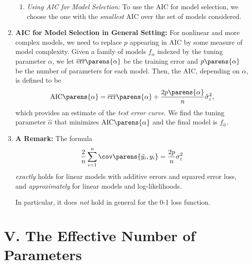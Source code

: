 \documentclass[12pt]{article}
\begin{document}
\begin{enumerate}[label=\textbf{\arabic*.}]
\begin{enumerate}
		\item \textit{Using AIC for Model Selection:} To use the AIC for model selection, we choose the one with the \emph{smallest} AIC over the set of models considered. 
		
	\end{enumerate}
	
	\item \textbf{AIC for Model Selection in General Setting:} For nonlinear and more complex models, we need to replace $p$ appearing in AIC by some measure of model complexity. \newline Given a family of models ${f}_{\alpha}$ indexed by the tuning parameter $\alpha$, we let $\overline{\mathrm{err}} \parens{\alpha}$ be the training error and $p \parens{\alpha}$ be the number of parameters for each model. Then, the AIC, depending on $\alpha$, is defined to be 
	\begin{align}
		\mathrm{AIC} \parens{\alpha} = \overline{\mathrm{err}} \parens{\alpha} + \frac{2 p \parens{\alpha}}{n} \hat{\sigma}_{\varepsilon}^2, 
	\end{align}
	which provides an estimate of the \textit{test error curve}. We find the tuning parameter $\hat{\alpha}$ that minimizes $\mathrm{AIC} \parens{\alpha}$ and the final model is $f_{\hat{\alpha}}$. 
	
	
	\item \textbf{A Remark:} The formula 
	\begin{align*}
		\frac{2}{n} \sum_{i=1}^n \cov \parens{\hat{y_i}, y_i} = \frac{2p}{n}\sigma_{\varepsilon}^2
	\end{align*}
	\emph{exactly} holds for linear models with additive errors and squared error loss, and \emph{approximately} for linear models and log-likelihoods. 
	
	In particular, it does \emph{not} hold in general for the 0-1 loss function. 
	
\end{enumerate}


\section*{V. The Effective Number of Parameters}
\end{document}
